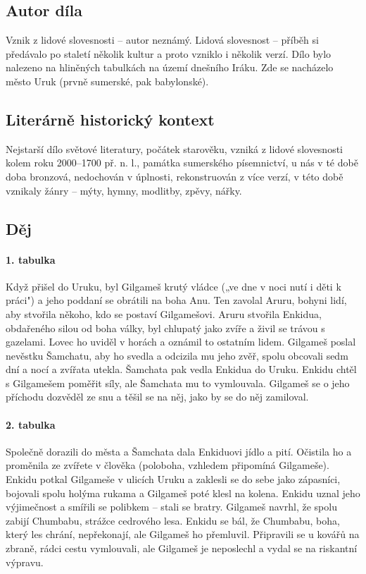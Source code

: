 \documentclass[12pt, a4paper]{article}
\begin{document}
\subsection*{Autor díla}
Vznik z lidové slovesnosti -- autor neznámý. Lidová slovesnost -- příběh si předávalo po staletí několik kultur a proto vzniklo i několik verzí. Dílo bylo nalezeno na hliněných tabulkách na území dnešního Iráku. Zde se nacházelo město Uruk (prvně sumerské, pak babylonské).

\subsection*{Literárně historický kontext}
Nejstarší dílo světové literatury, počátek starověku, vzniká z lidové slovesnosti kolem roku 2000--1700 př. n. l., památka sumerského písemnictví, u nás v té době doba bronzová, nedochován v úplnosti, rekonstruován z více verzí, v této době vznikaly žánry -- mýty, hymny, modlitby, zpěvy, nářky.

{\color{subsectioncolor}\hrulefill}
\subsection*{\color{subsectioncolor}Děj}
\paragraph{1. tabulka}
Když přišel do Uruku, byl Gilgameš krutý vládce („ve dne v noci nutí i děti k práci") a jeho poddaní se obrátili na boha Anu. Ten zavolal Aruru, bohyni lidí, aby stvořila někoho, kdo se postaví Gilgamešovi. Aruru stvořila Enkidua, obdařeného silou od boha války, byl chlupatý jako zvíře a živil se trávou s gazelami. Lovec ho uviděl v horách a oznámil to ostatním lidem. Gilgameš poslal nevěstku Šamchatu, aby ho svedla a odcizila mu jeho zvěř, spolu obcovali sedm dní a nocí a zvířata utekla. Šamchata pak vedla Enkidua do Uruku. Enkidu chtěl s Gilgamešem poměřit síly, ale Šamchata mu to vymlouvala. Gilgameš se o jeho příchodu dozvěděl ze snu a těšil se na něj, jako by se do něj zamiloval.

\paragraph{2. tabulka}
Společně dorazili do města a Šamchata dala Enkiduovi jídlo a pití. Očistila ho a proměnila ze zvířete v člověka (poloboha, vzhledem připomíná Gilgameše). Enkidu potkal Gilgameše v ulicích Uruku a zaklesli se do sebe jako zápasníci, bojovali spolu holýma rukama a Gilgameš poté klesl na kolena. Enkidu uznal jeho výjimečnost a smířili se polibkem -- stali se bratry. Gilgameš navrhl, že spolu zabijí Chumbabu, strážce cedrového lesa. Enkidu se bál, že Chumbabu, boha, který les chrání, nepřekonají, ale Gilgameš ho přemluvil. Připravili se u kovářů na zbraně, rádci cestu vymlouvali, ale Gilgameš je neposlechl a vydal se na riskantní výpravu.
\end{document}
